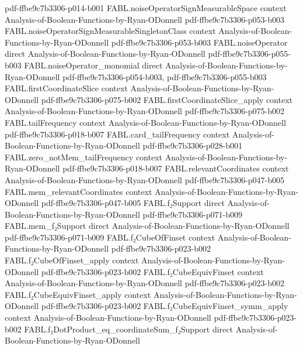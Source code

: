 \begin{theorem}
  {pdf-ffbe9c7b3306-p014-b001}
\proofstep
  {FABL.noiseOperatorSignMeasurableSpace}
  {context}
  {Analysis-of-Boolean-Functions-by-Ryan-ODonnell}
  {pdf-ffbe9c7b3306-p053-b003}
\proofstep
  {FABL.noiseOperatorSignMeasurableSingletonClass}
  {context}
  {Analysis-of-Boolean-Functions-by-Ryan-ODonnell}
  {pdf-ffbe9c7b3306-p053-b003}
\proofstep
  {FABL.noiseOperator}
  {direct}
  {Analysis-of-Boolean-Functions-by-Ryan-ODonnell}
  {pdf-ffbe9c7b3306-p055-b003}
\proofstep
  {FABL.noiseOperator_monomial}
  {direct}
  {Analysis-of-Boolean-Functions-by-Ryan-ODonnell}
  {pdf-ffbe9c7b3306-p054-b003,
    pdf-ffbe9c7b3306-p055-b003}
\proofstep
  {FABL.firstCoordinateSlice}
  {context}
  {Analysis-of-Boolean-Functions-by-Ryan-ODonnell}
  {pdf-ffbe9c7b3306-p075-b002}
\proofstep
  {FABL.firstCoordinateSlice_apply}
  {context}
  {Analysis-of-Boolean-Functions-by-Ryan-ODonnell}
  {pdf-ffbe9c7b3306-p075-b002}
\proofstep
  {FABL.tailFrequency}
  {context}
  {Analysis-of-Boolean-Functions-by-Ryan-ODonnell}
  {pdf-ffbe9c7b3306-p018-b007}
\proofstep
  {FABL.card_tailFrequency}
  {context}
  {Analysis-of-Boolean-Functions-by-Ryan-ODonnell}
  {pdf-ffbe9c7b3306-p028-b001}
\proofstep
  {FABL.zero_notMem_tailFrequency}
  {context}
  {Analysis-of-Boolean-Functions-by-Ryan-ODonnell}
  {pdf-ffbe9c7b3306-p018-b007}
\proofstep
  {FABL.relevantCoordinates}
  {context}
  {Analysis-of-Boolean-Functions-by-Ryan-ODonnell}
  {pdf-ffbe9c7b3306-p047-b005}
\proofstep
  {FABL.mem_relevantCoordinates}
  {context}
  {Analysis-of-Boolean-Functions-by-Ryan-ODonnell}
  {pdf-ffbe9c7b3306-p047-b005}
\proofstep
  {FABL.f₂Support}
  {direct}
  {Analysis-of-Boolean-Functions-by-Ryan-ODonnell}
  {pdf-ffbe9c7b3306-p071-b009}
\proofstep
  {FABL.mem_f₂Support}
  {direct}
  {Analysis-of-Boolean-Functions-by-Ryan-ODonnell}
  {pdf-ffbe9c7b3306-p071-b009}
\proofstep
  {FABL.f₂CubeOfFinset}
  {context}
  {Analysis-of-Boolean-Functions-by-Ryan-ODonnell}
  {pdf-ffbe9c7b3306-p023-b002}
\proofstep
  {FABL.f₂CubeOfFinset_apply}
  {context}
  {Analysis-of-Boolean-Functions-by-Ryan-ODonnell}
  {pdf-ffbe9c7b3306-p023-b002}
\proofstep
  {FABL.f₂CubeEquivFinset}
  {context}
  {Analysis-of-Boolean-Functions-by-Ryan-ODonnell}
  {pdf-ffbe9c7b3306-p023-b002}
\proofstep
  {FABL.f₂CubeEquivFinset_apply}
  {context}
  {Analysis-of-Boolean-Functions-by-Ryan-ODonnell}
  {pdf-ffbe9c7b3306-p023-b002}
\proofstep
  {FABL.f₂CubeEquivFinset_symm_apply}
  {context}
  {Analysis-of-Boolean-Functions-by-Ryan-ODonnell}
  {pdf-ffbe9c7b3306-p023-b002}
\proofstep
  {FABL.f₂DotProduct_eq_coordinateSum_f₂Support}
  {direct}
  {Analysis-of-Boolean-Functions-by-Ryan-ODonnell}

\end{theorem}
